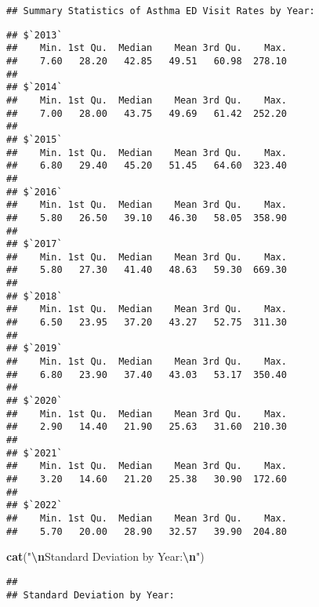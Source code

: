 \documentclass[
]{article}
\newenvironment{Shaded}{\begin{snugshade}}{\end{snugshade}}
\newcommand{\AttributeTok}[1]{\textcolor[rgb]{0.13,0.29,0.53}{#1}}
\newcommand{\ConstantTok}[1]{\textcolor[rgb]{0.56,0.35,0.01}{#1}}
\newcommand{\FunctionTok}[1]{\textcolor[rgb]{0.13,0.29,0.53}{\textbf{#1}}}
\newcommand{\NormalTok}[1]{#1}
\newcommand{\SpecialCharTok}[1]{\textcolor[rgb]{0.81,0.36,0.00}{\textbf{#1}}}
\newcommand{\StringTok}[1]{\textcolor[rgb]{0.31,0.60,0.02}{#1}}
\begin{document}
\begin{verbatim}
## Summary Statistics of Asthma ED Visit Rates by Year:
\end{verbatim}

\begin{Shaded}
\end{Shaded}

\begin{verbatim}
## $`2013`
##    Min. 1st Qu.  Median    Mean 3rd Qu.    Max. 
##    7.60   28.20   42.85   49.51   60.98  278.10 
## 
## $`2014`
##    Min. 1st Qu.  Median    Mean 3rd Qu.    Max. 
##    7.00   28.00   43.75   49.69   61.42  252.20 
## 
## $`2015`
##    Min. 1st Qu.  Median    Mean 3rd Qu.    Max. 
##    6.80   29.40   45.20   51.45   64.60  323.40 
## 
## $`2016`
##    Min. 1st Qu.  Median    Mean 3rd Qu.    Max. 
##    5.80   26.50   39.10   46.30   58.05  358.90 
## 
## $`2017`
##    Min. 1st Qu.  Median    Mean 3rd Qu.    Max. 
##    5.80   27.30   41.40   48.63   59.30  669.30 
## 
## $`2018`
##    Min. 1st Qu.  Median    Mean 3rd Qu.    Max. 
##    6.50   23.95   37.20   43.27   52.75  311.30 
## 
## $`2019`
##    Min. 1st Qu.  Median    Mean 3rd Qu.    Max. 
##    6.80   23.90   37.40   43.03   53.17  350.40 
## 
## $`2020`
##    Min. 1st Qu.  Median    Mean 3rd Qu.    Max. 
##    2.90   14.40   21.90   25.63   31.60  210.30 
## 
## $`2021`
##    Min. 1st Qu.  Median    Mean 3rd Qu.    Max. 
##    3.20   14.60   21.20   25.38   30.90  172.60 
## 
## $`2022`
##    Min. 1st Qu.  Median    Mean 3rd Qu.    Max. 
##    5.70   20.00   28.90   32.57   39.90  204.80
\end{verbatim}

\begin{Shaded}
\begin{Highlighting}[]
\FunctionTok{cat}\NormalTok{(}\StringTok{"}\SpecialCharTok{\textbackslash{}n}\StringTok{Standard Deviation by Year:}\SpecialCharTok{\textbackslash{}n}\StringTok{"}\NormalTok{)}
\end{Highlighting}
\end{Shaded}

\begin{verbatim}
## 
## Standard Deviation by Year:
\end{verbatim}
\end{document}
